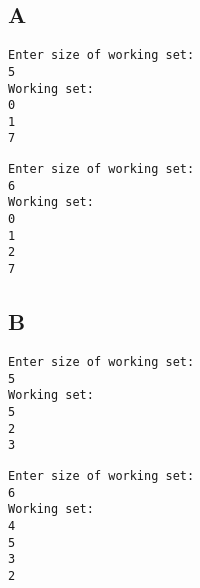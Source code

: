 \documentclass{article}
\begin{document}
\begin{minipage}{.49\textwidth}
\subsection*{A}
\begin{lstlisting}
Enter size of working set: 
5
Working set:
0
1
7
\end{lstlisting}
\begin{lstlisting}
Enter size of working set: 
6
Working set:
0
1
2
7
\end{lstlisting}
\end{minipage}
\begin{minipage}{.49\textwidth}
\subsection*{B}
\begin{lstlisting}
Enter size of working set: 
5
Working set:
5
2
3
\end{lstlisting}
\begin{lstlisting}
Enter size of working set: 
6
Working set:
4
5
3
2
\end{lstlisting}
\end{minipage}
\end{document}
